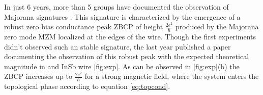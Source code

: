 In just 6 years, more than 5 groups have documented the observation of Majorana signatures \cite{das_zero-bias_2012,deng_anomalous_2012,nadj-perge_observation_2014,deng_majorana_2016,zhang_quantized_2018}. This signature is characterized by the emergence of a robust zero bias conductance peak ZBCP of height $\frac{2e^2}{\hbar}$ produced by the Majorana zero mode MZM localized at the edges of the wire. Though the first experiments didn't observed such an stable signature, the last year \citeauthor{zhang_quantized_2018} published a paper documenting the observation of this robust peak with the expected theoretical magnitude in and InSb wire \ref{fig:exp}. As can be observed in \ref{fig:exp}(b) the ZBCP increases up to $\frac{2e^2}{\hbar}$ for a strong magnetic field, where the system enters the topological phase according to equation \eqref{eq:topcond}. 



